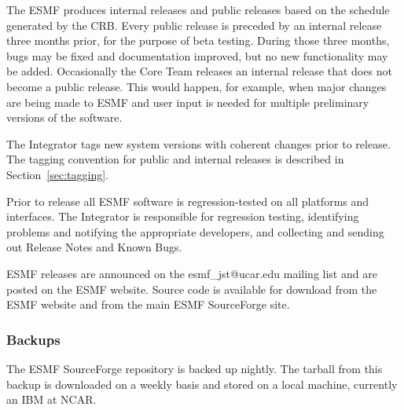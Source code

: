 The ESMF produces internal releases and public releases based
on the schedule generated by the CRB.  Every public release
is preceded by an internal release three months prior, for the
purpose of beta testing.  During those three months, bugs may be
fixed and documentation improved, but no new functionality may be
added.  Occasionally the Core Team releases an internal release
that does not become a public release.  This would happen, for 
example, when major changes are being made to ESMF and user
input is needed for multiple preliminary versions of the software.

The Integrator tags new system versions with coherent changes prior
to release.  The tagging convention for public and internal releases is
described in Section~\ref{sec:tagging}.  

Prior to release all ESMF software is regression-tested on all platforms
and interfaces.  The Integrator is responsible for regression testing,
identifying problems and notifying the appropriate developers, and 
collecting and sending out Release Notes and Known Bugs.

ESMF releases are announced
on the esmf\_jst@ucar.edu mailing list and are posted on the ESMF
website.  Source code is available for download from the ESMF
website and from the main ESMF SourceForge site.

\subsubsection{Backups}

The ESMF SourceForge repository is backed up nightly.  The tarball
from this backup is downloaded on a weekly basis and stored on a local
machine, currently an IBM at NCAR.











